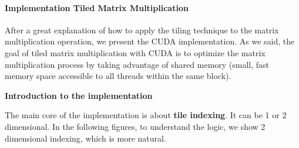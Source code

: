 \paragraph{Implementation Tiled Matrix Multiplication}

After a great explanation of how to apply the tiling technique to the matrix multiplication operation, we present the CUDA implementation. As we said, the goal of tiled matrix multiplication with CUDA is to optimize the matrix multiplication process by taking advantage of shared memory (small, fast memory space accessible to all threads within the same block).

\highspace
\begin{flushleft}
    \textcolor{Green3}{ \textbf{Introduction to the implementation}}
\end{flushleft}
The main core of the implementation is about \textbf{tile indexing}. It can be 1 or 2 dimensional. In the following figures, to understand the logic, we show 2 dimensional indexing, which is more natural.
